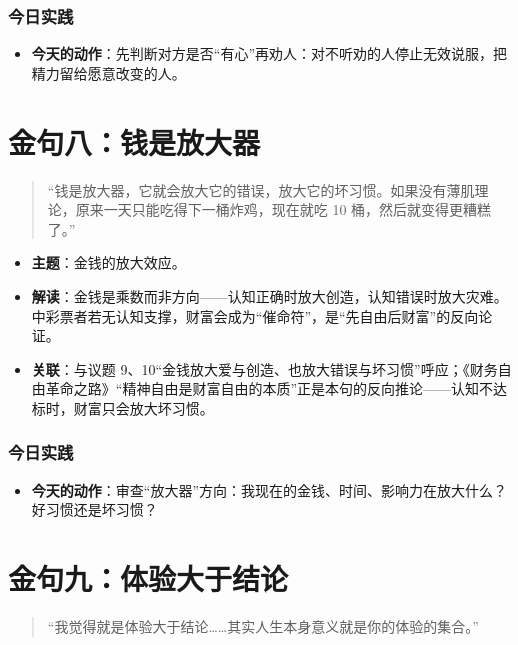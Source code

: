 \subsubsection{今日实践}

\begin{itemize}
\tightlist
\item
  \textbf{今天的动作}：先判断对方是否``有心''再劝人：对不听劝的人停止无效说服，把精力留给愿意改变的人。
\end{itemize}

\section{金句八：钱是放大器}

\begin{quote}
``钱是放大器，它就会放大它的错误，放大它的坏习惯。如果没有薄肌理论，原来一天只能吃得下一桶炸鸡，现在就吃
10 桶，然后就变得更糟糕了。''
\end{quote}

\begin{itemize}
\tightlist
\item
  \textbf{主题}：金钱的放大效应。
\item
  \textbf{解读}：金钱是乘数而非方向------认知正确时放大创造，认知错误时放大灾难。中彩票者若无认知支撑，财富会成为``催命符''，是``先自由后财富''的反向论证。
\item
  \textbf{关联}：与议题
  9、10``金钱放大爱与创造、也放大错误与坏习惯''呼应；《财务自由革命之路》``精神自由是财富自由的本质''正是本句的反向推论------认知不达标时，财富只会放大坏习惯。
\end{itemize}

\subsubsection{今日实践}

\begin{itemize}
\tightlist
\item
  \textbf{今天的动作}：审查``放大器''方向：我现在的金钱、时间、影响力在放大什么？好习惯还是坏习惯？
\end{itemize}

\section{金句九：体验大于结论}

\begin{quote}
``我觉得就是体验大于结论\ldots\ldots 其实人生本身意义就是你的体验的集合。''
\end{quote}

